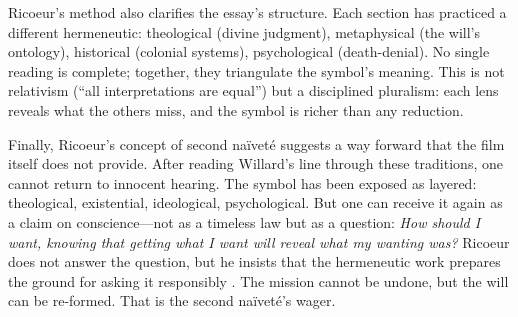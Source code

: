 Ricoeur's method also clarifies the essay's structure. Each section has practiced a different
hermeneutic: theological (divine judgment), metaphysical (the will's ontology), historical
(colonial systems), psychological (death-denial). No single reading is complete; together,
they triangulate the symbol's meaning. This is not relativism (``all interpretations are
equal'') but a disciplined pluralism: each lens reveals what the others miss, and the symbol
is richer than any reduction.

Finally, Ricoeur's concept of second naïveté suggests a way forward that the film itself does
not provide. After reading Willard's line through these traditions, one cannot return to
innocent hearing. The symbol has been exposed as layered: theological, existential,
ideological, psychological. But one can receive it again as a claim on conscience---not as a
timeless law but as a question: \emph{How should I want, knowing that getting what I want will
	reveal what my wanting was?} Ricoeur does not answer the question, but he insists that the
hermeneutic work prepares the ground for asking it responsibly \parencite{RicoeurSymbol1970}.
The mission cannot be undone, but the will can be re-formed. That is the second naïveté's
wager.
